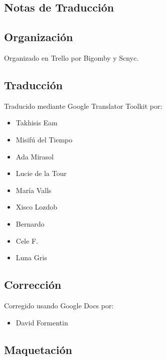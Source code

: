 \begin{center}
\section*{Notas de Traducción}
\end{center}

\mbox{}

\begingroup
\fontsize{9pt}{10pt}\selectfont
\parindent=0pt
\begin{multicols}{2}

\subsection*{Organización}\label{organizaciuxf3n}

Organizado en Trello por Bigomby y Scnyc.

\subsection*{Traducción}\label{traducciuxf3n}

Traducido mediante Google Translator Toolkit por:

\begin{itemize}
\itemsep1pt\parskip0pt
\item
  Takhisis Eam
\item
  Misifú del Tiempo
\item
  Ada Mirasol
\item
  Lucie de la Tour
\item
  María Valls
\item
  Xisco Lozdob
\item
  Bernardo
\item
  Cele F.
\item
  Luna Gris
\end{itemize}

\subsection*{Corrección}\label{correcciuxf3n}

Corregido usando Google Docs por:

\begin{itemize}
\itemsep1pt\parskip0pt
\item
  David Formentin
\end{itemize}

\subsection*{Maquetación}\label{maquetaciuxf3n}


\end{multicols}
